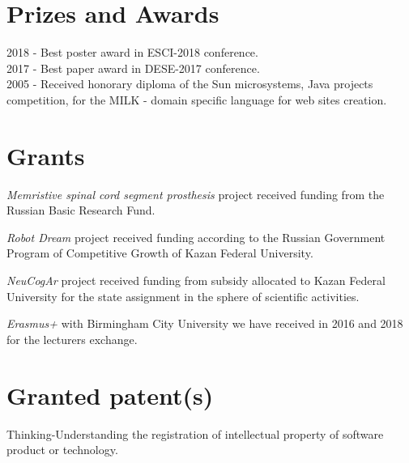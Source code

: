 \documentclass{moderncv}
\begin{document}

\section{Prizes and Awards}

2018 - Best poster award in ESCI-2018 conference.\\
2017 - Best paper award in DESE-2017 conference.\\
2005 - Received honorary diploma of the Sun microsystems, Java projects competition, for the MILK - domain specific language for web sites creation.\\

\section{Grants}

\emph{Memristive spinal cord segment prosthesis} project received funding from the Russian Basic Research Fund.

\emph{Robot Dream} project received funding according to the Russian Government Program of Competitive Growth of Kazan Federal University.

\emph{NeuCogAr} project received funding from subsidy allocated to Kazan Federal University for the state assignment in the sphere of scientific activities.

\emph{Erasmus+} with Birmingham City University we have received in 2016 and 2018 for the lecturers exchange. 

\section{Granted patent(s)}

Thinking-Understanding the registration of intellectual property of software product or technology.

 
\nocite{*}
\printbibliography[title={Papers}]
\end{document}

